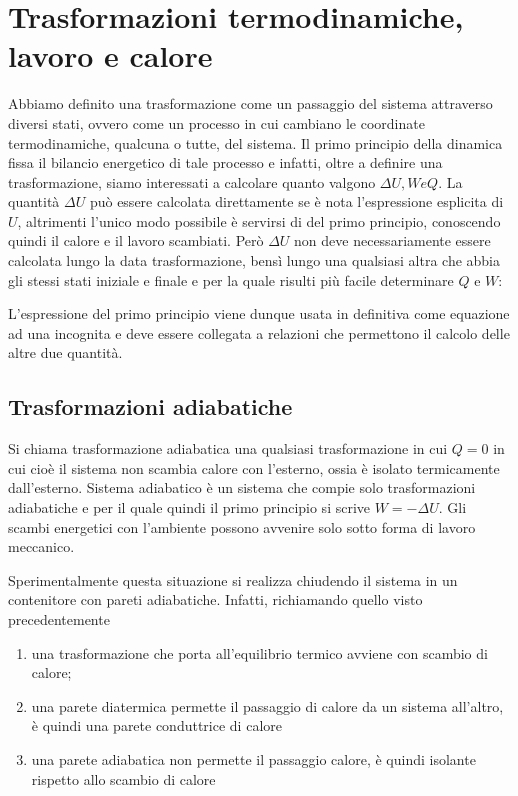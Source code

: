 \documentclass[class=book, crop=false, oneside, 12pt]{standalone}
\begin{document}
\section{Trasformazioni termodinamiche, lavoro e calore}

Abbiamo definito una trasformazione come un passaggio del sistema attraverso diversi stati, ovvero come un processo in cui cambiano le coordinate termodinamiche, qualcuna o tutte, del sistema.
Il primo principio della dinamica fissa il bilancio energetico di tale processo e infatti, oltre a definire una trasformazione, siamo interessati a calcolare quanto valgono \(\Delta U, W e Q\). 
La quantità \(\Delta U\) può essere calcolata direttamente se è nota l'espressione esplicita di \(U\), altrimenti l'unico modo possibile è servirsi di del primo principio, conoscendo quindi il calore e il lavoro scambiati. 
Però \(\Delta U\) non deve necessariamente essere calcolata lungo la data trasformazione, bensì lungo una qualsiasi altra che abbia gli stessi stati iniziale e finale e per la quale risulti più facile determinare \(Q\) e \(W\): 

L'espressione del primo principio viene dunque usata in definitiva come equazione ad una incognita e deve essere collegata a relazioni che permettono il calcolo delle altre due quantità.

\subsection{Trasformazioni adiabatiche}

Si chiama trasformazione adiabatica una qualsiasi trasformazione in cui \(Q = 0\) in cui cioè il sistema non scambia calore con l'esterno, ossia è isolato termicamente dall'esterno.
Sistema adiabatico è un sistema che compie solo trasformazioni adiabatiche e per il quale quindi il primo principio si scrive \(W = - \Delta U\).
Gli scambi energetici con l'ambiente possono avvenire solo sotto forma di lavoro meccanico. 

Sperimentalmente questa situazione si realizza chiudendo il sistema in un contenitore con pareti adiabatiche. 
Infatti, richiamando quello visto precedentemente

\begin{enumerate}
    \item una trasformazione che porta all'equilibrio termico avviene con scambio di calore; 
    \item una parete diatermica permette il passaggio di calore da un sistema all'altro, è quindi una parete conduttrice di calore
    \item una parete adiabatica non permette il passaggio calore, è quindi isolante rispetto allo scambio di calore
\end{enumerate}
\end{document}
